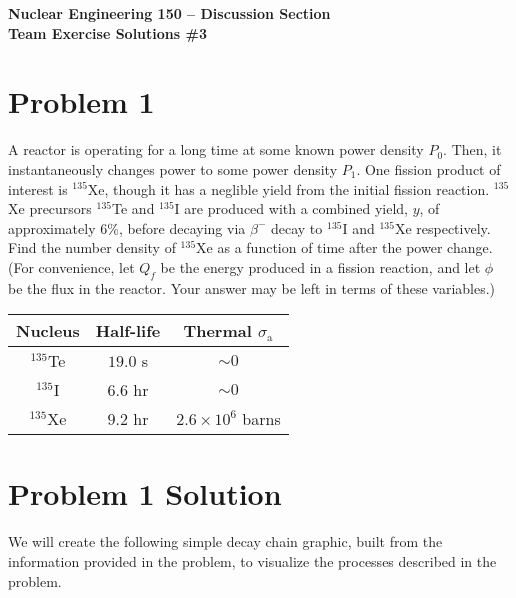 \documentclass{report}
\begin{document}
\begin{center}
\textbf{\large Nuclear Engineering 150 -- Discussion Section}\\ 
\textbf{Team Exercise Solutions \#3}
\end{center}

\section*{Problem 1}

A reactor is operating for a long time at some known power density $P_0$. Then, it instantaneously changes power to some power density $P_1$. One fission product of interest is $^{135}$Xe, though it has a neglible yield from the initial fission reaction. $^{135}$Xe precursors $^{135}$Te and $^{135}$I are produced with a combined yield, $y$, of approximately 6\%, before decaying via $\beta^{-}$ decay to $^{135}$I and $^{135}$Xe respectively. Find the number density of $^{135}$Xe as a function of time after the power change. (For convenience, let $Q_f$ be the energy produced in a fission reaction, and let $\phi$ be the flux in the reactor. Your answer may be left in terms of these variables.)

\begin{table}[htbp]
	\centering
	\begin{tabular}{|c|c|c|}
			\hline
			Nucleus		&	Half-life 	& Thermal $\sigma_{\text{a}}$ \\
			\hline
			$^{135}$Te	&  $19.0$ s 	& $\sim 0$\\
			$^{135}$I	&  $6.6$ hr 	& $\sim 0$\\
			$^{135}$Xe	&  $9.2$ hr 	& $2.6 \times 10^6$ barns \\
			\hline
	\end{tabular}
	\label{tab:design-specs}
\end{table}



\section*{Problem 1 Solution}

We will create the following simple decay chain graphic, built from the information provided in the problem, to visualize the processes described in the problem.
\end{document}
